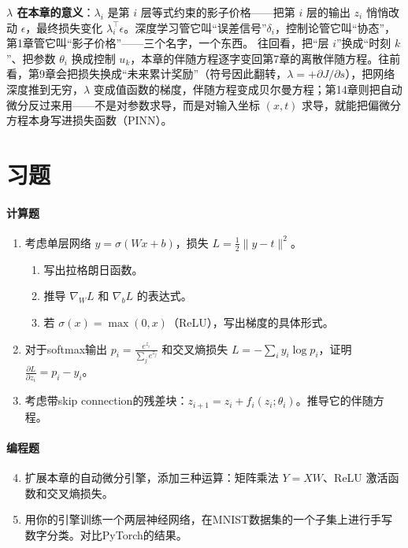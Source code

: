\begin{physicalmeaning}
\textbf{$\lambda$ 在本章的意义}：$\lambda_i$ 是第 $i$ 层等式约束的影子价格——把第 $i$ 层的输出 $z_i$ 悄悄改动 $\epsilon$，最终损失变化 $\lambda_i^\top \epsilon$。深度学习管它叫“误差信号”$\delta_i$，控制论管它叫“协态”，第1章管它叫“影子价格”——三个名字，一个东西。
往回看，把“层 $i$”换成“时刻 $k$”、把参数 $\theta_i$ 换成控制 $u_k$，本章的伴随方程逐字变回第7章的离散伴随方程。往前看，第9章会把损失换成“未来累计奖励”（符号因此翻转，$\lambda = +\partial J/\partial s$），把网络深度推到无穷，$\lambda$ 变成值函数的梯度，伴随方程变成贝尔曼方程；第14章则把自动微分反过来用——不是对参数求导，而是对输入坐标 $(x, t)$ 求导，就能把偏微分方程本身写进损失函数（PINN）。
\end{physicalmeaning}

\section{习题}

\paragraph{计算题}
\begin{enumerate}
    \item 考虑单层网络 $y = \sigma(Wx + b)$，损失 $L = \frac{1}{2}\|y - t\|^2$。
    \begin{enumerate}
        \item 写出拉格朗日函数。
        \item 推导 $\nabla_W L$ 和 $\nabla_b L$ 的表达式。
        \item 若 $\sigma(x) = \max(0, x)$（ReLU），写出梯度的具体形式。
    \end{enumerate}
    
    \item 对于softmax输出 $p_i = \frac{e^{z_i}}{\sum_j e^{z_j}}$ 和交叉熵损失 $L = -\sum_i y_i \log p_i$，证明 $\frac{\partial L}{\partial z_i} = p_i - y_i$。
    
    \item 考虑带skip connection的残差块：$z_{i+1} = z_i + f_i(z_i; \theta_i)$。推导它的伴随方程。
\end{enumerate}

\paragraph{编程题}
\begin{enumerate}
    \setcounter{enumi}{3}
    \item 扩展本章的自动微分引擎，添加三种运算：矩阵乘法 $Y = XW$、ReLU 激活函数和交叉熵损失。
    
    \item 用你的引擎训练一个两层神经网络，在MNIST数据集的一个子集上进行手写数字分类。对比PyTorch的结果。
\end{enumerate}

